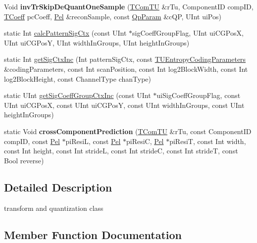 \begin{DoxyCompactItemize}
\mbox{\label{class_t_com_tr_quant_a5342a1ebf7d2ccd626dfe6330391d071}} 
Void {\bfseries inv\+Tr\+Skip\+De\+Quant\+One\+Sample} (\hyperlink{class_t_com_t_u}{T\+Com\+TU} \&r\+Tu, Component\+ID comp\+ID, \hyperlink{_type_def_8h_a5bdd3b17d14ed1978c366d2d958c0300}{T\+Coeff} pc\+Coeff, \hyperlink{_type_def_8h_af92141699657699b4b547be0c8517541}{Pel} \&recon\+Sample, const \hyperlink{struct_qp_param}{Qp\+Param} \&c\+QP, U\+Int ui\+Pos)
\item 
static Int \hyperlink{class_t_com_tr_quant_a646d5f830c4a86368e22f0df73ae0265}{calc\+Pattern\+Sig\+Ctx} (const U\+Int $\ast$sig\+Coeff\+Group\+Flag, U\+Int ui\+C\+G\+PosX, U\+Int ui\+C\+G\+PosY, U\+Int width\+In\+Groups, U\+Int height\+In\+Groups)
\item 
static Int \hyperlink{class_t_com_tr_quant_afb180cf8cdfc5e48056967eb62e005df}{get\+Sig\+Ctx\+Inc} (Int pattern\+Sig\+Ctx, const \hyperlink{struct_t_u_entropy_coding_parameters}{T\+U\+Entropy\+Coding\+Parameters} \&coding\+Parameters, const Int scan\+Position, const Int log2\+Block\+Width, const Int log2\+Block\+Height, const Channel\+Type chan\+Type)
\item 
static U\+Int \hyperlink{class_t_com_tr_quant_a2bde3e265497ade4354329b4e2ad999d}{get\+Sig\+Coeff\+Group\+Ctx\+Inc} (const U\+Int $\ast$ui\+Sig\+Coeff\+Group\+Flag, const U\+Int ui\+C\+G\+PosX, const U\+Int ui\+C\+G\+PosY, const U\+Int width\+In\+Groups, const U\+Int height\+In\+Groups)
\item 
\mbox{\label{class_t_com_tr_quant_a634d825d2b77ef649839e155e258247d}} 
static Void {\bfseries cross\+Component\+Prediction} (\hyperlink{class_t_com_t_u}{T\+Com\+TU} \&r\+Tu, const Component\+ID comp\+ID, const \hyperlink{_type_def_8h_af92141699657699b4b547be0c8517541}{Pel} $\ast$pi\+ResiL, const \hyperlink{_type_def_8h_af92141699657699b4b547be0c8517541}{Pel} $\ast$pi\+ResiC, \hyperlink{_type_def_8h_af92141699657699b4b547be0c8517541}{Pel} $\ast$pi\+ResiT, const Int width, const Int height, const Int strideL, const Int strideC, const Int strideT, const Bool reverse)
\end{DoxyCompactItemize}


\subsection{Detailed Description}
transform and quantization class 

\subsection{Member Function Documentation}
\mbox{\label{class_t_com_tr_quant_a646d5f830c4a86368e22f0df73ae0265}} 
